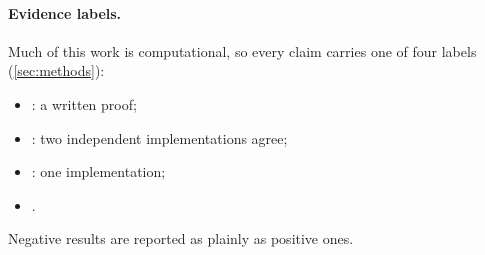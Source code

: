 \paragraph{Evidence labels.}
Much of this work is computational, so every claim carries one of four labels (\cref{sec:methods}):
\begin{itemize}
\item {}: a written proof;
\item {}: two independent implementations agree;
\item {}: one implementation;
\item {}.
\end{itemize}
Negative results are reported as plainly as positive ones.
